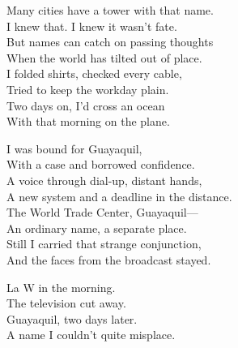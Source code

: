 \begin{lyrics}
Many cities have a tower with that name.\\
I knew that. I knew it wasn’t fate.\\
But names can catch on passing thoughts\\
When the world has tilted out of place.\\
I folded shirts, checked every cable,\\
Tried to keep the workday plain.\\
Two days on, I’d cross an ocean\\
With that morning on the plane.

I was bound for Guayaquil,\\
With a case and borrowed confidence.\\
A voice through dial-up, distant hands,\\
A new system and a deadline in the distance.\\
The World Trade Center, Guayaquil—\\
An ordinary name, a separate place.\\
Still I carried that strange conjunction,\\
And the faces from the broadcast stayed.

La W in the morning.\\
The television cut away.\\
Guayaquil, two days later.\\
A name I couldn’t quite misplace.
\end{lyrics}

